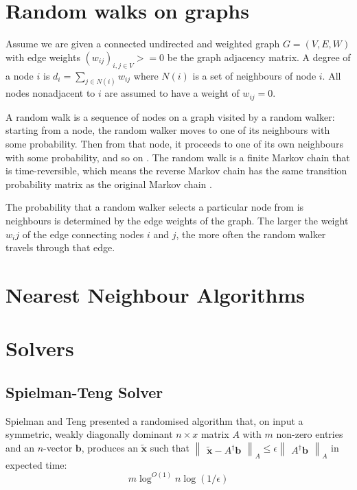 \section{Random walks on graphs}
\label{sec:randomWalks}

Assume we are given a connected undirected and weighted graph $G = (V,E,W)$ with
edge weights $(w_{ij})_{i,j \in V} >= 0$ be the graph adjacency matrix. A degree
of a node $i$ is $d_{i} = \sum_{j \in N(i)} w_{ij}$ where $N(i)$ is a set of 
neighbours of node $i$. All nodes nonadjacent to $i$ are assumed to have a 
weight of $w_{ij} = 0$.

A random walk is a sequence of nodes on a graph visited by a random walker: 
starting from a node, the random walker moves to one of its neighbours with some
probability. Then from that node, it proceeds to one of its own neighbours with 
some probability, and so on \cite{Khoa:2012}. The random walk is a finite Markov
chain that is time-reversible, which means the reverse Markov chain has the same
transition probability matrix as the original Markov chain \cite{Lovasz:1996}.

The probability that a random walker selects a particular node from is 
neighbours is determined by the edge weights of the graph. The larger the weight
${w_ij}$ of the edge connecting nodes $i$ and $j$, the more often the random 
walker travels through that edge.

\section{Nearest Neighbour Algorithms}
\label{sec:nearestNeighbourAlgorithms}

\section{Solvers}
\label{sec:solvers}

\subsection{Spielman-Teng Solver}
\label{sec:spielmanTengSolver}
\nocite{Spielman:2006}
Spielman and Teng presented a randomised algorithm that, on input a symmetric, 
weakly diagonally dominant $n{\times}x$ matrix $A$ with $m$ non-zero entries and
an $n$-vector $\mathbf{b}$, produces an $\tilde{\mathbf{x}}$ such that 
$\begin{Vmatrix} \tilde{\textbf{x}} - A^{\dagger}\textbf{b} \end{Vmatrix}_{A} 
\leq \epsilon \begin{Vmatrix} A^{\dagger}\mathbf{b} \end{Vmatrix}_{A}$ in 
expected time:
\begin{equation}
m \log^{O(1)} n \log (1/\epsilon)
\end{equation}

